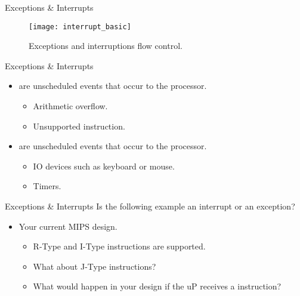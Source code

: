 % 
\begin{frame}{Exceptions \& Interrupts}{}
\begin{figure}
\centering
\texttt{[image: interrupt\_basic]}
\caption{Exceptions and interruptions flow control.}
\label{Figure:Interruption_basic}
\end{figure}
\end{frame}

% 
\begin{frame}{Exceptions \& Interrupts}{}
\begin{itemize}
\item {} are  unscheduled events that occur  to the processor.
\pauseprint
  \begin{itemize}
  \item Arithmetic overflow.
  \item Unsupported instruction.
  \end{itemize}
\pauseprint
\item {} are  unscheduled events that occur  to the processor.
\pauseprint
  \begin{itemize}
  \item \ac{IO} devices such as keyboard or mouse.
  \item Timers.
  \end{itemize}
\end{itemize}
\end{frame} 

% 
\begin{frame}{Exceptions \& Interrupts}{}
Is the following example an interrupt or an exception?
\begin{itemize}
\item Your current \ac{MIPS} design.
  \begin{itemize}
  \item R-Type and I-Type instructions are supported.
  \item What about J-Type instructions?
  \item What would happen in your design if the \ac{uP} receives a  instruction?
  \end{itemize}
\end{itemize}
\end{frame} 

